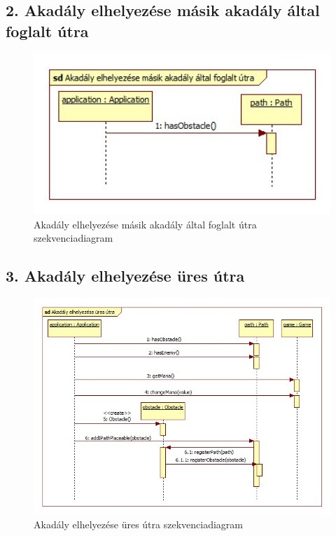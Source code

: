 \subsection{2. Akadály elhelyezése másik akadály által foglalt útra}
\begin{figure}[H]
\begin{center}
\includegraphics[width=17cm]{chapters/chapter05/images/sd_Akadaly_elhelyezese_masik_akadaly_altal_foglalt_utra.jpg}
\caption{Akadály elhelyezése másik akadály által foglalt útra szekvenciadiagram}
\label{fig:sd_Akadaly_elhelyezese_masik_akadaly_altal_foglalt_utra}
\end{center}
\end{figure}

\subsection{3. Akadály elhelyezése üres útra}
\begin{figure}[H]
\begin{center}
\includegraphics[width=17cm]{chapters/chapter05/images/sd_Akadaly_elhelyezese_ures_utra.jpg}
\caption{Akadály elhelyezése üres útra szekvenciadiagram}
\label{fig:sd_Akadaly_elhelyezese_ures_utra}
\end{center}
\end{figure}

